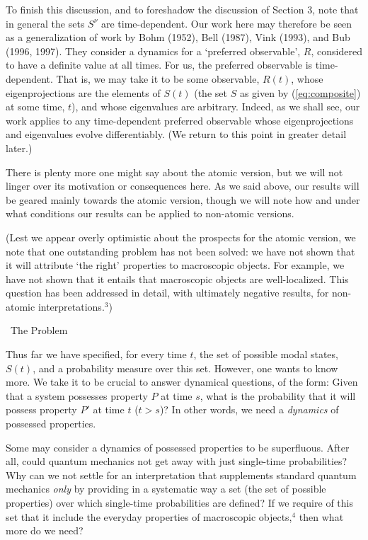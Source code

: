 \documentclass[12pt]{article}
\renewcommand{\subsection}[1]{\addtocounter{subsection}{1}
                           \setcounter{subsubsection}{0}
                           \vspace{20pt}
                           \begin{center}
                           \thesubsection \ #1
                           \end{center}
                           \vspace{20pt}}
\newcommand{\gn}{\nu}                                           %
\begin{document}
To finish this discussion, and to foreshadow the discussion of Section 
3, note that in general the sets $S^{\gn}$ are time-dependent.  Our 
work here may therefore be seen as a generalization of work by Bohm 
(1952), Bell (1987), Vink (1993), and Bub (1996, 1997).  They consider 
a dynamics for a `preferred observable', $R$, considered to have a 
definite value at all times.  For us, the preferred observable is 
time-dependent.  That is, we may take it to be some observable, 
$R(t)$, whose eigenprojections are the elements of $S(t)$ (the set $S$ 
as given by (\ref{eq:composite}) at some time, $t$), and whose 
eigenvalues are arbitrary.  Indeed, as we shall see, our work applies 
to any time-dependent preferred observable whose eigenprojections and 
eigenvalues evolve differentiably.  (We return to this point in 
greater detail later.)

There is plenty more one might say about the atomic version, but we
will not linger over its motivation or consequences here.  As we said
above, our results will be geared mainly towards the atomic version,
though we will note how and under what conditions our results can be
applied to non-atomic versions.

(Lest we appear overly optimistic about the prospects for the atomic
version, we note that one outstanding problem has not been solved: we have
not shown that it will attribute `the right' properties to macroscopic
objects. For example, we have not shown that it entails that macroscopic
objects are well-localized. This question has been addressed in detail,
with ultimately negative results, for non-atomic interpretations.$^{3}$)


\subsection{The Problem}


Thus far we have specified, for every time $t$, the set of possible 
modal states, $S(t)$, and a probability measure over this set.  
However, one wants to know more.  We take it to be crucial to answer 
dynamical questions, of the form: Given that a system possesses 
property $P$ at time $s$, what is the probability that it will possess 
property $P'$ at time $t$ ($t > s$)?  In other words, we need a {\it 
dynamics} of possessed properties.

Some may consider a dynamics of possessed properties to be
superfluous.  After all, could quantum mechanics not get away with
just single-time probabilities?  Why can we not settle for an
interpretation that supplements standard quantum mechanics {\it only}
by providing in a systematic way a set (the set of possible
properties) over which single-time probabilities are defined?  If
we require of this set that it include the everyday properties of
macroscopic objects,$^4$ then what more do we need?
\end{document}
